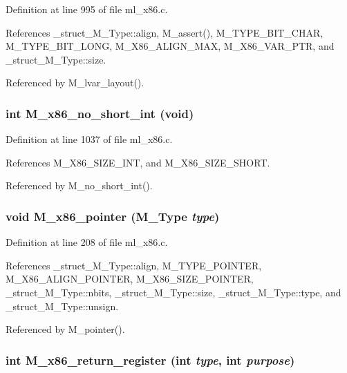 Definition at line 995 of file ml\_\-x86.c.

References \_\-struct\_\-M\_\-Type::align, M\_\-assert(), M\_\-TYPE\_\-BIT\_\-CHAR, M\_\-TYPE\_\-BIT\_\-LONG, M\_\-X86\_\-ALIGN\_\-MAX, M\_\-X86\_\-VAR\_\-PTR, and \_\-struct\_\-M\_\-Type::size.

Referenced by M\_\-lvar\_\-layout().
\subsubsection{\setlength{\rightskip}{0pt plus 5cm}int M\_\-x86\_\-no\_\-short\_\-int (void)}\label{ml__x86_8c_1b6a39fb220cdc71ba2d2222668ed953}




Definition at line 1037 of file ml\_\-x86.c.

References M\_\-X86\_\-SIZE\_\-INT, and M\_\-X86\_\-SIZE\_\-SHORT.

Referenced by M\_\-no\_\-short\_\-int().
\subsubsection{\setlength{\rightskip}{0pt plus 5cm}void M\_\-x86\_\-pointer (\bf{M\_\-Type} {\em type})}\label{ml__x86_8c_9c529d82b3fd27fe93a9bbf967632659}




Definition at line 208 of file ml\_\-x86.c.

References \_\-struct\_\-M\_\-Type::align, M\_\-TYPE\_\-POINTER, M\_\-X86\_\-ALIGN\_\-POINTER, M\_\-X86\_\-SIZE\_\-POINTER, \_\-struct\_\-M\_\-Type::nbits, \_\-struct\_\-M\_\-Type::size, \_\-struct\_\-M\_\-Type::type, and \_\-struct\_\-M\_\-Type::unsign.

Referenced by M\_\-pointer().
\subsubsection{\setlength{\rightskip}{0pt plus 5cm}int M\_\-x86\_\-return\_\-register (int {\em type}, int {\em purpose})}\label{ml__x86_8c_5c58ab9d70640c1278564a25f5217d65}




